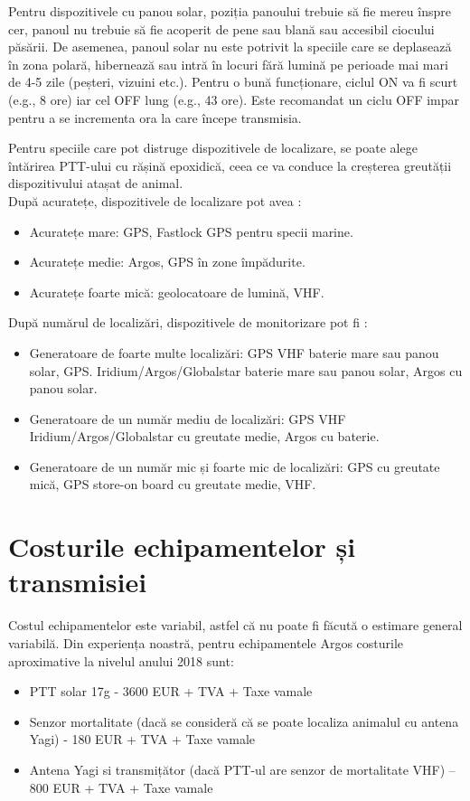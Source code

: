 \documentclass[11pt,onehalfspacing]{elife}
\begin{document}
Pentru dispozitivele cu panou solar, poziția panoului trebuie să fie mereu înspre cer, panoul nu trebuie să fie acoperit de pene sau blană sau accesibil ciocului păsării. De asemenea, panoul solar nu este potrivit la speciile care se deplasează în zona polară, hibernează sau intră în locuri fără lumină pe perioade mai mari de 4-5 zile (peșteri, vizuini etc.). Pentru o bună funcționare, ciclul ON va fi scurt (e.g., 8 ore) iar cel OFF lung (e.g., 43 ore). Este recomandat un ciclu OFF impar pentru a se incrementa ora la care începe transmisia.

Pentru speciile care pot distruge dispozitivele de localizare, se poate alege întărirea PTT-ului cu rășină epoxidică, ceea ce va conduce la creșterea greutății dispozitivului atașat de animal.\\

După acuratețe, dispozitivele de localizare pot avea \citep{Thomas2012}:
\begin{itemize}
    \item Acuratețe mare: GPS, Fastlock GPS pentru specii marine.
\item Acuratețe medie: Argos, GPS în zone împădurite.
\item Acuratețe foarte mică: geolocatoare de lumină, VHF.
\end{itemize}

După numărul de localizări, dispozitivele de monitorizare pot fi \citep{Thomas2012}:
\begin{itemize}
    \item Generatoare de foarte multe localizări: GPS VHF baterie mare sau panou solar, GPS. Iridium/Argos/Globalstar baterie mare sau panou solar, Argos cu panou solar.
    \item Generatoare de un număr mediu de localizări: GPS VHF Iridium/Argos/Globalstar cu greutate medie, Argos cu baterie.
    \item Generatoare de un număr mic și foarte mic de localizări: GPS cu greutate mică, GPS store-on board cu greutate medie, VHF.
\end{itemize}

\section{Costurile echipamentelor și transmisiei}
Costul echipamentelor este variabil, astfel că nu poate fi făcută o estimare general variabilă.  Din experiența noastră, pentru echipamentele Argos costurile aproximative la nivelul anului 2018 sunt:
\begin{itemize}
    \item PTT solar 17g - 3600 EUR + TVA + Taxe vamale
    \item Senzor mortalitate (dacă se consideră că se poate localiza animalul cu antena Yagi) - 180 EUR + TVA + Taxe vamale
    \item Antena Yagi si transmițător (dacă PTT-ul are senzor de mortalitate VHF) – 800 EUR + TVA + Taxe vamale
\end{itemize}
\end{document}
